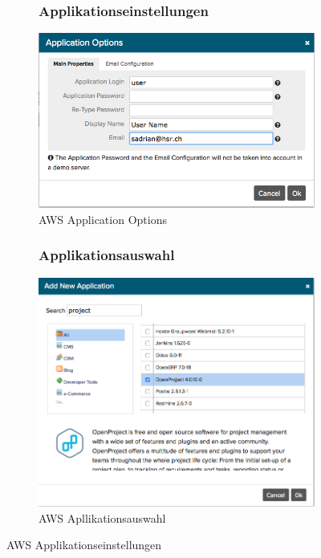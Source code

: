 \begin{figure}[!htbp]
  \centering
  \begin{subfigure}[b]{.49\textwidth}
\subsubsection{Applikationseinstellungen}
\includegraphics[width=\textwidth]{./03_Analyse/03_Bitnami/images/aws_application_options}
\caption{AWS Application Options}
\end{subfigure}
  \hfill
\begin{subfigure}[b]{.49\textwidth}
\subsubsection{Applikationsauswahl}
\includegraphics[width=\textwidth]{./03_Analyse/03_Bitnami/images/aws_add_application}
\caption{AWS Apllikationsauswahl}
\end{subfigure}
\caption{AWS Applikationseinstellungen}
\end{figure}

